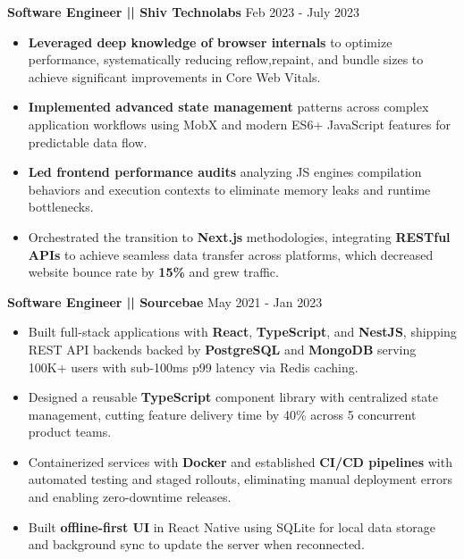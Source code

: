 \documentclass[100pt,a4paper]{article}
\begin{document}
\vspace{5pt}
\textbf{Software Engineer || Shiv Technolabs}
\hfill Feb 2023 - July 2023
\begin{itemize}
\vspace{2pt}
\item {\textbf{Leveraged deep knowledge of browser internals} to optimize performance, systematically reducing reflow,repaint, and bundle sizes to achieve significant improvements in Core Web Vitals.}
\item {\textbf{Implemented advanced state management} patterns across complex application workflows using MobX and modern ES6+ JavaScript features for predictable data flow.}
\item {\textbf{Led frontend performance audits} analyzing JS engines compilation behaviors and execution contexts to eliminate memory leaks and runtime bottlenecks.}
\item {Orchestrated the transition to \textbf{Next.js} methodologies, integrating \textbf{RESTful APIs} to achieve seamless data transfer across platforms, which decreased website bounce rate by \textbf{15\%} and grew traffic.}
\end{itemize}




\vspace{5pt}
\textbf{Software Engineer || Sourcebae}
\hfill May 2021 - Jan 2023
\begin{itemize}
\vspace{2pt}
\item {Built full-stack applications with \textbf{React}, \textbf{TypeScript}, and \textbf{NestJS}, shipping REST API backends backed by \textbf{PostgreSQL} and \textbf{MongoDB} serving 100K+ users with sub-100ms p99 latency via Redis caching.}
\item {Designed a reusable \textbf{TypeScript} component library with centralized state management, cutting feature delivery time by 40\% across 5 concurrent product teams.}
\item {Containerized services with \textbf{Docker} and established \textbf{CI/CD pipelines} with automated testing and staged rollouts, eliminating manual deployment errors and enabling zero-downtime releases.}
\item {Built \textbf{offline-first UI} in React Native using SQLite for local data storage and background sync to update the server when reconnected.}

\end{itemize}
\end{document}
